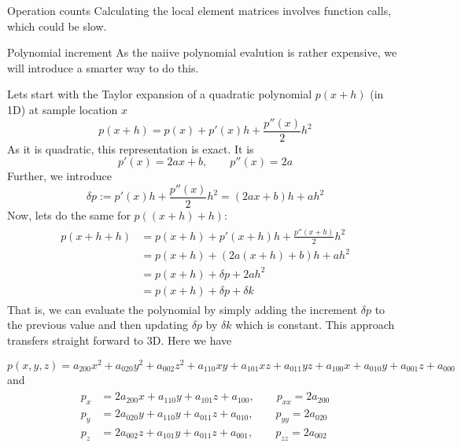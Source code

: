 \documentclass[a4paper,11pt,reqno]{amsart}
\numberwithin{figure}{section}
\numberwithin{table}{section}
\begin{document}
\begin{section}{Operation counts}
Calculating the local element matrices involves function calls, which could be slow.\\

\end{section}






\clearpage

\begin{section}{Polynomial increment }
\label{sec:polynomialIncrement }
%
As the naiive polynomial evalution is rather expensive, we will
introduce a smarter way to do this.

Lets start with the Taylor expansion of a quadratic polynomial $p(x+h)$ (in 1D) 
at sample location $x$
\begin{equation}
p(x+h) = p(x) + p'(x)h + \frac{p''(x)}{2}h^2
\end{equation}
As it is quadratic, this representation is exact.
It is
\begin{equation}
p'(x) = 2ax+b,\qquad p''(x) = 2a
\end{equation}
Further, we introduce 
\begin{equation}
\delta p  := p'(x)h + \frac{p''(x)}{2}h^2 = (2ax+b)h + ah^2
\end{equation}
Now, lets do the same for $p((x+h)+h)$:
\begin{align}
\begin{split}
p(x+h+h) &= p(x+h) + p'(x+h)h + \frac{p''(x+h)}{2}h^2 \\
  &= p(x+h) + (2a(x+h)+b)h + ah^2 \\
  &= p(x+h) + \delta p + 2ah^2 \\
  &= p(x+h) + \delta p +\delta k
\end{split}
\end{align}
That is, we can evaluate the polynomial by simply
adding the increment $\delta p$ to the previous 
value and then updating $\delta p$ by $\delta k$ 
which is constant. This approach transfers straight
forward to 3D. Here we have

\begin{equation}
p(x,y,z) = a_{200}x^2 + a_{020}y^2 + a_{002}z^2 + a_{110}xy + a_{101}xz + a_{011}yz + 
a_{100}x + a_{010}y + a_{001}z + a_{000}
\end{equation}
and
\begin{align}
\begin{split}
p_x    &= 2a_{200}x+a_{110}y + a_{101}z + a_{100},\qquad p_{xx} = 2a_{200}\\
p_y    &= 2a_{020}y+a_{110}y + a_{011}z + a_{010},\qquad p_{yy} = 2a_{020}\\
p_z    &= 2a_{002}z+a_{101}y + a_{011}z + a_{001},\qquad p_{zz} = 2a_{002}
\end{split}
\end{align}


\end{section}
\end{document}

